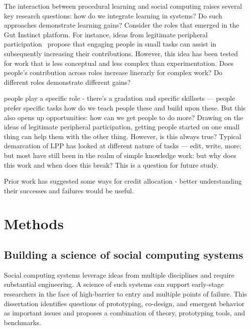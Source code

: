 The interaction between procedural learning and social computing raises several key research questions: how do we integrate learning in systems? Do such approaches demonstrate learning gains? Consider the roles that emerged in the Gut Instinct platform. For instance, ideas from legitimate peripheral participation~\cite{Bryant2005} propose that engaging people in small tasks can assist in subsequently increasing their contributions. However, this idea has been tested for work that is less conceptual and less complex than experimentation. Does people's contribution across roles increase linerarly for complex work? Do different roles demonstrate different gains?

people play a specific role - there’s a gradation and specific skillsets — people prefer specific tasks how do we teach people these and build upon these. But this also opens up opportunities:  how can we get people to do more? Drawing on the ideas of legitimate peripheral participation, getting people started on one small thing can help them with the other thing. However, is this always true? Typical demarcation of LPP has looked at different nature of tasks — edit, write, more; but most have still been in the realm of simple knowledge work: but why does this work and when does this break? This is a question for future study.


 Prior work has suggested some ways for credit allocation - better understanding their successes and failures would be useful. 

\section{Methods} 

\subsection{Building a science of social computing systems}
Social computing systems leverage ideas from multiple disciplines and require substantial engineering. A science of such systems can support early-stage researchers in the face of high-barrier to entry and multiple points of failure. This dissertation identifies questions of prototyping, co-design, and emergent behavior as important issues and proposes a combination of theory, prototyping tools, and benchmarks. 


